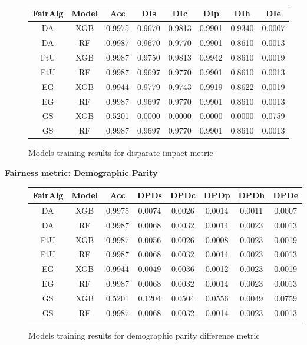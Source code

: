 \begin{figure}[H]
    \centering
    \begin{tabular}{|c|c|c|c|c|c|c|c|}
        \hline
        \textbf{FairAlg} & \textbf{Model} & \textbf{Acc} & \textbf{DIs} & \textbf{DIc} & \textbf{DIp} & \textbf{DIh} & \textbf{DIe} \\
        \hline
        DA & XGB & 0.9975 & 0.9670 & 0.9813 & 0.9901 & 0.9340 & 0.0007 \\
        \hline
        DA & RF & 0.9987 & 0.9670 & 0.9770 & 0.9901 & 0.8610 & 0.0013 \\
        \hline
        FtU & XGB & 0.9987 & 0.9750 & 0.9813 & 0.9942 & 0.8610 & 0.0019 \\
        \hline
        FtU & RF & 0.9987 & 0.9697 & 0.9770 & 0.9901 & 0.8610 & 0.0013 \\
        \hline
        EG & XGB & 0.9944 & 0.9779 & 0.9743 & 0.9919 & 0.8622 & 0.0019 \\
        \hline
        EG & RF & 0.9987 & 0.9697 & 0.9770 & 0.9901 & 0.8610 & 0.0013 \\
        \hline
        GS & XGB & 0.5201 & 0.0000 & 0.0000 & 0.0000 & 0.0000 & 0.0759 \\
        \hline
        GS & RF & 0.9987 & 0.9697 & 0.9770 & 0.9901 & 0.8610 & 0.0013 \\
        \hline
    \end{tabular}
    \caption{Models training results for disparate impact metric}
    \label{fig:results}
\end{figure}

\textbf{Fairness metric: Demographic Parity}

\begin{figure}[H]
    \centering
    \begin{tabular}{|c|c|c|c|c|c|c|c|}
        \hline
        \textbf{FairAlg} & \textbf{Model} & \textbf{Acc} & \textbf{DPDs} & \textbf{DPDc} & \textbf{DPDp} & \textbf{DPDh} & \textbf{DPDe} \\
        \hline
        DA & XGB & 0.9975 & 0.0074 & 0.0026 & 0.0014 & 0.0011 & 0.0007\\
        \hline
        DA & RF & 0.9987 & 0.0068 & 0.0032 & 0.0014 & 0.0023 & 0.0013\\
        \hline
        FtU & XGB & 0.9987 & 0.0056 & 0.0026 & 0.0008 & 0.0023 & 0.0019 \\
        \hline
        FtU & RF & 0.9987 & 0.0068 & 0.0032 & 0.0014 & 0.0023 & 0.0013 \\
        \hline
        EG & XGB & 0.9944 & 0.0049 & 0.0036 & 0.0012 & 0.0023 & 0.0019 \\
        \hline
        EG & RF & 0.9987 & 0.0068 & 0.0032 & 0.0014 & 0.0023 & 0.0013 \\
        \hline
        GS & XGB & 0.5201 & 0.1204 & 0.0504 & 0.0556 & 0.0049 & 0.0759 \\
        \hline
        GS & RF & 0.9987 & 0.0068 & 0.0032 & 0.0014 & 0.0023 & 0.0013 \\
        \hline
    \end{tabular}
    \caption{Models training results for demographic parity difference metric}
    \label{fig:results}
\end{figure}

